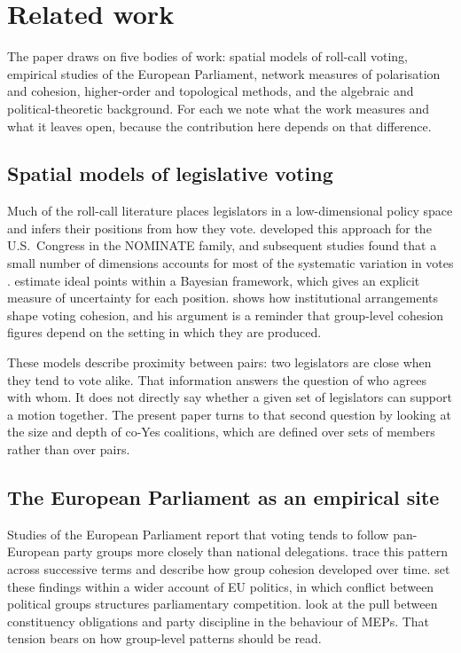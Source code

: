 \documentclass[a4paper,fleqn,oneside]{cas-sc}
\theoremstyle{definition}
\theoremstyle{plain}
\begin{document}
\section{Related work}
\label{sec:related}

The paper draws on five bodies of work: spatial models of roll-call voting,
empirical studies of the European Parliament, network measures of
polarisation and cohesion, higher-order and topological methods, and the
algebraic and political-theoretic background. For each we note what the work
measures and what it leaves open, because the contribution here depends on
that difference.

\subsection{Spatial models of legislative voting}

Much of the roll-call literature places legislators in a low-dimensional
policy space and infers their positions from how they vote.
\citet{PooleRosenthal1985} developed this approach for the U.S.\ Congress in
the NOMINATE family, and subsequent studies found that a small number of
dimensions accounts for most of the systematic variation in votes
\citep{PooleRosenthal1991,PooleRosenthal1997}. \citet{ClintonJackmanRivers2004}
estimate ideal points within a Bayesian framework, which gives an explicit
measure of uncertainty for each position. \citet{Carey2009} shows how
institutional arrangements shape voting cohesion, and his argument is a
reminder that group-level cohesion figures depend on the setting in which
they are produced.

These models describe proximity between pairs: two legislators are close when
they tend to vote alike. That information answers the question of who agrees
with whom. It does not directly say whether a given set of legislators can
support a motion together. The present paper turns to that second question by
looking at the size and depth of co-Yes coalitions, which are defined over
sets of members rather than over pairs.

\subsection{The European Parliament as an empirical site}

Studies of the European Parliament report that voting tends to follow
pan-European party groups more closely than national delegations.
\citet{HixNouryRoland2007} trace this pattern across successive terms and
describe how group cohesion developed over time. \citet{HixHoyland2011} set
these findings within a wider account of EU politics, in which conflict between
political groups structures parliamentary competition.
\citet{FarrellScully2007} look at the pull between constituency
obligations and party discipline in the behaviour of MEPs. That tension bears
on how group-level patterns should be read.
\end{document}
